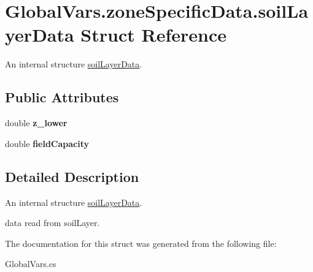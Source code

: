 \hypertarget{struct_global_vars_1_1zone_specific_data_1_1soil_layer_data}{}\section{Global\+Vars.\+zone\+Specific\+Data.\+soil\+Layer\+Data Struct Reference}
\label{struct_global_vars_1_1zone_specific_data_1_1soil_layer_data}


An internal structure \mbox{\hyperlink{struct_global_vars_1_1zone_specific_data_1_1soil_layer_data}{soil\+Layer\+Data}}.  


\subsection*{Public Attributes}
\begin{DoxyCompactItemize}
\item 
\mbox{\label{struct_global_vars_1_1zone_specific_data_1_1soil_layer_data_a92d37767e9dfbc2853580e82bf9a79ef}} 
double {\bfseries z\+\_\+lower}
\item 
\mbox{\label{struct_global_vars_1_1zone_specific_data_1_1soil_layer_data_a8ec6cdbbe40d5e04bbb7a07faa5ddffb}} 
double {\bfseries field\+Capacity}
\end{DoxyCompactItemize}


\subsection{Detailed Description}
An internal structure \mbox{\hyperlink{struct_global_vars_1_1zone_specific_data_1_1soil_layer_data}{soil\+Layer\+Data}}. 

data read from soil\+Layer. 

The documentation for this struct was generated from the following file\+:\begin{DoxyCompactItemize}
\item 
Global\+Vars.\+cs\end{DoxyCompactItemize}
